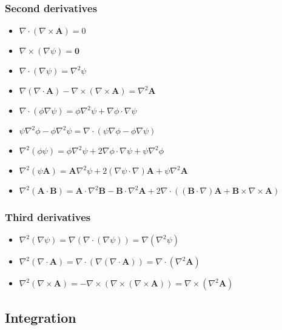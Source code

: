 \documentclass{article}
\begin{document}
\subsubsection{Second derivatives}
\begin{itemize}
\item
  $\nabla\cdot(\nabla\times\mathbf{A})=0 $
\item
  $\nabla\times(\nabla\psi)= \mathbf{0} $
\item
  $\nabla\cdot(\nabla\psi)=\nabla^{2}\psi $
\item
  $\nabla\left(\nabla\cdot\mathbf{A}\right)
  -\nabla\times\left(\nabla\times\mathbf{A}\right)=\nabla^{2}\mathbf{A} $
\item
  $\nabla\cdot(\phi\nabla\psi)=\phi\nabla^{2}\psi + \nabla\phi\cdot\nabla\psi $
\item
  $\psi\nabla^2\phi-\phi\nabla^2\psi=
  \nabla\cdot\left(\psi\nabla\phi-\phi\nabla\psi\right)$
\item
  $\nabla^2(\phi\psi)=
  \phi\nabla^2\psi+2\nabla\phi\cdot\nabla\psi+\psi\nabla^2\phi$
\item
  $\nabla^2(\psi\mathbf{A})=
  \mathbf{A}\nabla^2\psi+2(\nabla\psi\cdot\nabla)\mathbf{A}
  +\psi\nabla^2\mathbf{A}$
\item
  $\nabla^2(\mathbf{A}\cdot\mathbf{B})=
  \mathbf{A}\cdot\nabla^2\mathbf{B} - \mathbf{B}\cdot\nabla^2\mathbf{A}
  + 2\nabla\cdot((\mathbf{B}\cdot\nabla)\mathbf{A}
  + \mathbf{B}\times\nabla\times\mathbf{A})$
\end{itemize}

\subsubsection{Third derivatives}
\begin{itemize}
\item
  $\nabla^{2}(\nabla\psi) = \nabla(\nabla\cdot(\nabla\psi))
  = \nabla(\nabla^{2}\psi)$
\item
  $\nabla^{2}(\nabla\cdot\mathbf{A})
  =\nabla\cdot(\nabla(\nabla\cdot\mathbf{A}))=\nabla\cdot(\nabla^{2}\mathbf{A})$
\item
  $\nabla^{2}(\nabla\times\mathbf{A}) =
  -\nabla\times(\nabla\times(\nabla\times\mathbf{A}))
  = \nabla\times(\nabla^{2}\mathbf{A})$
\end{itemize}

\subsection{Integration}
\end{document}
